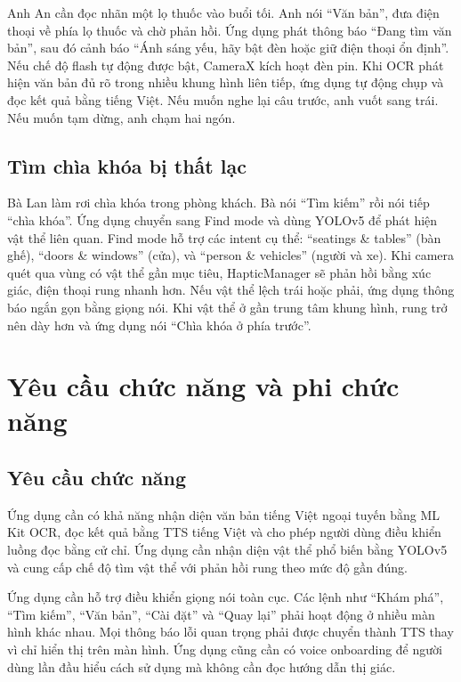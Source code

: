 \documentclass[a4paper,13pt]{report}
\begin{document}
Anh An cần đọc nhãn một lọ thuốc vào buổi tối. Anh nói ``Văn bản'', đưa điện thoại về phía lọ thuốc và chờ phản hồi. Ứng dụng phát thông báo ``Đang tìm văn bản'', sau đó cảnh báo ``Ánh sáng yếu, hãy bật đèn hoặc giữ điện thoại ổn định''. Nếu chế độ flash tự động được bật, CameraX kích hoạt đèn pin. Khi OCR phát hiện văn bản đủ rõ trong nhiều khung hình liên tiếp, ứng dụng tự động chụp và đọc kết quả bằng tiếng Việt. Nếu muốn nghe lại câu trước, anh vuốt sang trái. Nếu muốn tạm dừng, anh chạm hai ngón.

\subsection{Tìm chìa khóa bị thất lạc}

Bà Lan làm rơi chìa khóa trong phòng khách. Bà nói ``Tìm kiếm'' rồi nói tiếp ``chìa khóa''. Ứng dụng chuyển sang Find mode và dùng YOLOv5 để phát hiện vật thể liên quan. Find mode hỗ trợ các intent cụ thể: ``seatings \& tables'' (bàn ghế), ``doors \& windows'' (cửa), và ``person \& vehicles'' (người và xe). Khi camera quét qua vùng có vật thể gần mục tiêu, HapticManager sẽ phản hồi bằng xúc giác, điện thoại rung nhanh hơn. Nếu vật thể lệch trái hoặc phải, ứng dụng thông báo ngắn gọn bằng giọng nói. Khi vật thể ở gần trung tâm khung hình, rung trở nên dày hơn và ứng dụng nói ``Chìa khóa ở phía trước''.

\section{Yêu cầu chức năng và phi chức năng}

\subsection{Yêu cầu chức năng}

Ứng dụng cần có khả năng nhận diện văn bản tiếng Việt ngoại tuyến bằng ML Kit OCR, đọc kết quả bằng TTS tiếng Việt và cho phép người dùng điều khiển luồng đọc bằng cử chỉ. Ứng dụng cần nhận diện vật thể phổ biến bằng YOLOv5 và cung cấp chế độ tìm vật thể với phản hồi rung theo mức độ gần đúng.

Ứng dụng cần hỗ trợ điều khiển giọng nói toàn cục. Các lệnh như ``Khám phá'', ``Tìm kiếm'', ``Văn bản'', ``Cài đặt'' và ``Quay lại'' phải hoạt động ở nhiều màn hình khác nhau. Mọi thông báo lỗi quan trọng phải được chuyển thành TTS thay vì chỉ hiển thị trên màn hình. Ứng dụng cũng cần có voice onboarding để người dùng lần đầu hiểu cách sử dụng mà không cần đọc hướng dẫn thị giác.
\end{document}
